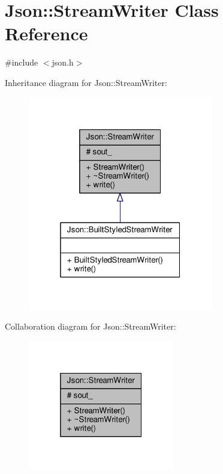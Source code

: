 \hypertarget{classJson_1_1StreamWriter}{}\section{Json\+:\+:Stream\+Writer Class Reference}
\label{classJson_1_1StreamWriter}


{\ttfamily \#include $<$json.\+h$>$}



Inheritance diagram for Json\+:\+:Stream\+Writer\+:
\nopagebreak
\begin{figure}[H]
\begin{center}
\leavevmode
\includegraphics[width=229pt]{d2/d90/classJson_1_1StreamWriter__inherit__graph}
\end{center}
\end{figure}


Collaboration diagram for Json\+:\+:Stream\+Writer\+:
\nopagebreak
\begin{figure}[H]
\begin{center}
\leavevmode
\includegraphics[width=181pt]{dc/da1/classJson_1_1StreamWriter__coll__graph}
\end{center}
\end{figure}
